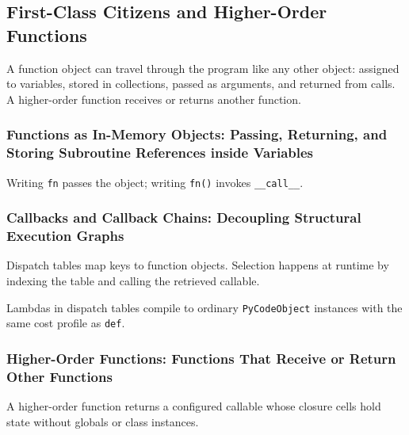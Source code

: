 \subsection{First-Class Citizens and Higher-Order Functions}

A function object can travel through the program like any other object: assigned to variables, stored in collections, passed as arguments, and returned from calls. A higher-order function receives or returns another function.

\subsubsection{Functions as In-Memory Objects: Passing, Returning, and Storing Subroutine References inside Variables}



Writing \texttt{fn} passes the object; writing \texttt{fn()} invokes \texttt{\_\_call\_\_}.

\subsubsection{Callbacks and Callback Chains: Decoupling Structural Execution Graphs}

Dispatch tables map keys to function objects. Selection happens at runtime by indexing the table and calling the retrieved callable.



Lambdas in dispatch tables compile to ordinary \texttt{PyCodeObject} instances with the same cost profile as \texttt{def}.

\subsubsection{Higher-Order Functions: Functions That Receive or Return Other Functions}



A higher-order function returns a configured callable whose closure cells hold state without globals or class instances.

